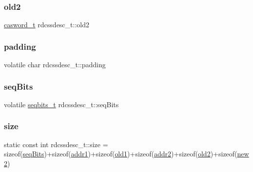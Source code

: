 \mbox{\label{structrdcssdesc__t_a8e6fb7c8f1fb27020a85852b9325da38}} 
\subsubsection{\texorpdfstring{old2}{old2}}
{\footnotesize\ttfamily \hyperlink{rq__unsafe_8h_ad45142aaf2ff20a036dc6242b8483e9c}{casword\+\_\+t} rdcssdesc\+\_\+t\+::old2}

\mbox{\label{structrdcssdesc__t_afe1bb552d0d0d4618f99d44937bb3ab7}} 
\subsubsection{\texorpdfstring{padding}{padding}}
{\footnotesize\ttfamily volatile char rdcssdesc\+\_\+t\+::padding}

\mbox{\label{structrdcssdesc__t_a1844984d511a02ef16f2a691ad991d40}} 
\subsubsection{\texorpdfstring{seq\+Bits}{seqBits}}
{\footnotesize\ttfamily volatile \hyperlink{kcas__reuse__htm__impl_8h_a997daf56279be481f5c4294647725689}{seqbits\+\_\+t} rdcssdesc\+\_\+t\+::seq\+Bits}

\mbox{\label{structrdcssdesc__t_a6e3db7bcc43c398181f0647a9aedccdf}} 
\subsubsection{\texorpdfstring{size}{size}}
{\footnotesize\ttfamily static const int rdcssdesc\+\_\+t\+::size = sizeof(\hyperlink{structrdcssdesc__t_a1844984d511a02ef16f2a691ad991d40}{seq\+Bits})+sizeof(\hyperlink{structrdcssdesc__t_ab47535b838f7a74d99e96738a42d204c}{addr1})+sizeof(\hyperlink{structrdcssdesc__t_a719fca618bebcab487aae8512a2b0f79}{old1})+sizeof(\hyperlink{structrdcssdesc__t_afe6e31e7b7fea3b440994e84eba9c802}{addr2})+sizeof(\hyperlink{structrdcssdesc__t_a8e6fb7c8f1fb27020a85852b9325da38}{old2})+sizeof(\hyperlink{structrdcssdesc__t_ac49ae2fc71c98669baafb8140b84b65a}{new2})\hspace{0.3cm}{\ttfamily [static]}}



